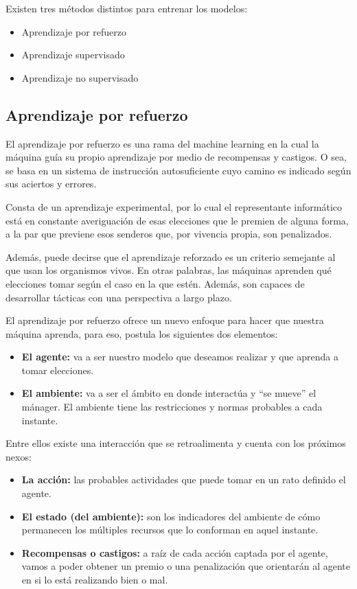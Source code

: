 Existen tres métodos distintos para entrenar los modelos:

\begin{itemize}
    \item Aprendizaje por refuerzo
    \item Aprendizaje supervisado
    \item Aprendizaje no supervisado
\end{itemize}

\subsection{Aprendizaje por refuerzo}
El aprendizaje por refuerzo es una rama del machine learning en la cual la máquina guía su propio aprendizaje por medio de recompensas y castigos. O sea, se basa en un sistema de instrucción autosuficiente cuyo camino es indicado según sus aciertos y errores.\par

Consta de un aprendizaje experimental, por lo cual el representante informático está en constante averiguación de esas elecciones que le premien de alguna forma, a la par que previene esos senderos que, por vivencia propia, son penalizados. \par

Además, puede decirse que el aprendizaje reforzado es un criterio semejante al que usan los organismos vivos. En otras palabras, las máquinas aprenden qué elecciones tomar según el caso en la que estén. Además, son capaces de desarrollar tácticas con una perspectiva a largo plazo.\par

El aprendizaje por refuerzo ofrece un nuevo enfoque para hacer que nuestra máquina aprenda, para eso, postula los siguientes dos elementos:

\begin{itemize}

    \item \textbf{El agente:} va a ser nuestro modelo que deseamos realizar y que aprenda a tomar elecciones.
    \item \textbf{El ambiente:} va a ser el ámbito en donde interactúa y “se mueve” el mánager. El ambiente tiene las restricciones y normas probables a cada instante.
    
\end{itemize}
Entre ellos existe una interacción que se retroalimenta y cuenta con los próximos nexos:

\begin{itemize}

    \item \textbf{La acción:} las probables actividades que puede tomar en un rato definido el agente.
    \item \textbf{El estado (del ambiente):} son los indicadores del ambiente de cómo permanecen los múltiples recursos que lo conforman en aquel instante.
    \item \textbf{Recompensas o castigos:}  a raíz de cada acción captada por el agente, vamos a poder obtener un premio o una penalización que orientarán al agente en si lo está realizando bien o mal.
    
\end{itemize}

